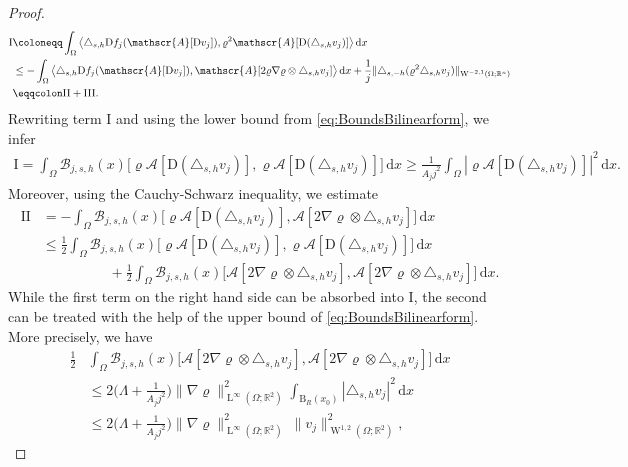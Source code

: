 \documentclass[a4paper,10pt,reqno,oneside]{amsart}
\numberwithin{equation}{section}
\newcommand{\R}{\mathbb R}
\newcommand{\ball}{\mathrm{B}}
\newcommand{\A}{\mathscr{A}}
\newcommand{\lebe}{\operatorname{L}}
\newcommand{\sobo}{\operatorname{W}}
\newcommand{\D}{\mathrm{D}}
\newcommand{\dx}[1]{\,\mathrm{d}#1}
\newcommand{\skalarProd}[2]{\big\langle#1,#2\big\rangle}
\newcommand{\abs}[1]{\left\lvert#1\right\rvert}
\begin{document}
\begin{proof}
 	\begin{align*}
 		\mathrm{I} 
 		&\coloneqq \int_\Omega \skalarProd{\triangle_{s,h}\D f_j (\A[\D v_j])}{\varrho^2 \A[\D (\triangle_{s,h} v_j)]}\dx{x} \notag \\
 		& \leq - \int_\Omega  \skalarProd{\triangle_{s,h}\D f_j(\A[\D v_j])}{ \A[2\varrho\nabla\varrho\otimes \triangle_{s,h} v_j]}\dx{x}
 		+\frac{1}{j} \|\triangle_{s,-h}(\varrho^2 \triangle_{s,h} v_j)\|_{\sobo^{-2,1}(\Omega;\R^n)} \\
 		&\eqqcolon \mathrm{II} + \mathrm{III}\notag. 
 		\end{align*}
 	Rewriting term $\mathrm{I}$ and using the lower bound from \eqref{eq:BoundsBilinearform}, we infer
 	\begin{align}\label{eq:BoundBelow_I}
 		\mathrm{I} = \int_\Omega \mathscr{B}_{j,s,h}(x) \big[\varrho \A[\D (\triangle_{s,h} v_j)], \varrho \A[\D (\triangle_{s,h} v_j)]\big] \dx{x} \geq \frac{1}{A_j j^2} \int_\Omega \abs{\varrho \A[\D (\triangle_{s,h} v_j)]}^2 \dx{x}. 
 	\end{align}
 	Moreover, using the Cauchy-Schwarz inequality, we estimate
 	\begin{align*}
 		\mathrm{II} &= -\int_\Omega \mathscr{B}_{j,s,h}(x) \big[\varrho \A[\D (\triangle_{s,h} v_j)], \A[2\nabla \varrho\otimes \triangle_{s,h} v_j]\big]\dx{x} \\
 		&\leq \frac{1}{2} \int_\Omega \mathscr{B}_{j,s,h}(x) \big[\varrho \A[\D (\triangle_{s,h} v_j)], \varrho \A[\D(\triangle_{s,h} v_j)]\big]\dx{x} \\
	 	&\hspace{2cm}+\frac{1}{2} \int_\Omega \mathscr{B}_{j,s,h}(x) \big[ \A[2\nabla \varrho\otimes \triangle_{s,h}v_j], \A[2 \nabla \varrho \otimes \triangle_{s,h} v_j]\big]\dx{x}.  
 	\end{align*}
 	While the first term on the right hand side can be absorbed into $\mathrm{I}$, the second can be treated with the help of the upper bound of \eqref{eq:BoundsBilinearform}. More precisely, we have 
 	\begin{align*}
 		\frac{1}{2} &\int_\Omega \mathscr{B}_{j,s,h}(x) \big[ \A[2\nabla \varrho\otimes \triangle_{s,h}v_j], \A[2 \nabla \varrho \otimes \triangle_{s,h} v_j]\big]\dx{x} \\
 		&\leq 2\bigg(\Lambda + \frac{1}{A_j j^2}\bigg)\|\nabla\varrho\|_{\lebe^\infty(\Omega;\R^2)}^2 \int_{\ball_{R}(x_0)} \abs{\triangle_{s,h} v_j}^2 \dx{x} \\
 		&\leq 2\bigg(\Lambda + \frac{1}{A_j j^2}\bigg)\|\nabla\varrho\|_{\lebe^\infty(\Omega;\R^2)}^2~ \|v_j\|_{\sobo^{1,2}(\Omega;\R^2)}^2,

\end{align*}
\end{proof}
\end{document}
